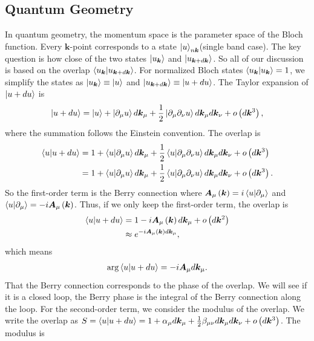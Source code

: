 \documentclass[12pt, oneside]{article}
\newcommand{\pa}{\partial}
\newcommand{\p}[1]{\left(#1\right)}
\numberwithin{equation}{subsection}
\begin{document}
\subsection{Quantum Geometry}
In quantum geometry, the momentum space is the parameter space of the Bloch function. Every \(\bm{k}\)-point corresponds to a state \(\ket{u}_{n \bm{k}}\)(single band case). The key question is how close of the two states \(\ket{u_{\bm{k}}}\) and \(\ket{u_{\bm{k} + d \bm{k}}}\). So all of our discussion is based on the overlap \(\braket{u_{\bm{k}} | u_{\bm{k} + d \bm{k}}}\). For normalized Bloch states \(\braket{u_{\bm{k}} | u_{\bm{k}}} = 1\), we simplify the states as \(\ket{u_{\bm{k}}} \equiv \ket{u}\) and \(\ket{u_{\bm{k} + d \bm{k}}} \equiv \ket{u + d u}\). The Taylor expansion of \(\ket{u + du}\) is 
\begin{align}
	\ket{u + du} = \ket{u} + \ket{\pa_\mu u} d \bm{k}_\mu + \frac12 \ket{\pa_\mu \pa_\nu u} d \bm{k}_\mu d \bm{k}_\nu + o\p{d \bm{k}^3},
\end{align}
where the summation follows the Einstein convention. The overlap is
\begin{align}
	\begin{split}
		\braket{u | u + du} & = 1 + \braket{u | \pa_\mu u} d \bm{k}_\mu + \frac12 \braket{u | \pa_\mu \pa_\nu u} d \bm{k}_\mu d \bm{k}_\nu + o\p{d \bm{k}^3} \\
		& = 1 +  \braket{u | \pa_\mu u} d \bm{k}_\mu + \frac12 \braket{u | \pa_\mu \pa_\nu u} d \bm{k}_\mu d \bm{k}_\nu + o\p{d \bm{k}^3}.
	\end{split}	
\end{align}
So the first-order term is the Berry connection where \(\bm{A}_{\mu} \p{\bm{k}} = i \braket{u | \pa_\mu}\) and \(\braket{u | \pa_\mu} = - i \bm{A}_{\mu} \p{\bm{k}}\). Thus, if we only keep the first-order term, the overlap is 
\begin{align}
	\begin{split}
		\braket{u | u + du} & = 1 - i \bm{A}_{\mu} \p{\bm{k}} d \bm{k}_\mu + o\p{d \bm{k}^2} \\
		& \approx e^{- i \bm{A}_{\mu} \p{\bm{k}} d \bm{k}_\mu },
	\end{split}
\end{align}
which means
\begin{align}
	\arg \braket{u | u + du} = -i \bm{A}_\mu d \bm{k}_\mu.
\end{align}
That the Berry connection corresponds to the phase of the overlap. We will see if it is a closed loop, the Berry phase is the integral of the Berry connection along the loop. For the second-order term, we consider the modulus of the overlap. We write the overlap as \(S = \braket{u | u + du} = 1 + \alpha_\mu d \bm{k}_\mu + \frac12 \beta_{\mu \nu} d \bm{k}_\mu d \bm{k}_\nu + o \p{d \bm{k}^3}\). The modulus is
\end{document}
